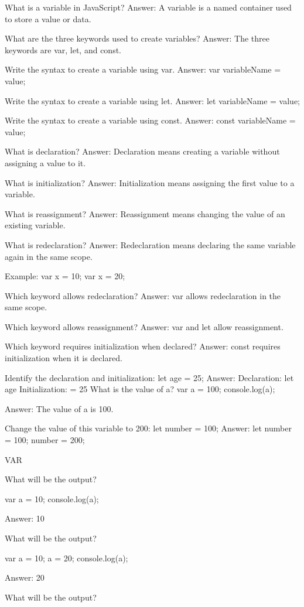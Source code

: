 What is a variable in JavaScript?
Answer: A variable is a named container used to store a value or data.

What are the three keywords used to create variables?
Answer: The three keywords are var, let, and const.

Write the syntax to create a variable using var.
Answer: var variableName = value;

Write the syntax to create a variable using let.
Answer: let variableName = value;

Write the syntax to create a variable using const.
Answer: const variableName = value;

What is declaration?
Answer: Declaration means creating a variable without assigning a value to it.

What is initialization?
Answer: Initialization means assigning the first value to a variable.


What is reassignment?
Answer: Reassignment means changing the value of an existing variable.


What is redeclaration?
Answer: Redeclaration means declaring the same variable again in the same scope.

Example: var x = 10; var x = 20;

Which keyword allows redeclaration?
Answer: var allows redeclaration in the same scope.

Which keyword allows reassignment?
Answer: var and let allow reassignment.

Which keyword requires initialization when declared?
Answer: const requires initialization when it is declared.

Identify the declaration and initialization: let age = 25;
Answer: Declaration: let age
Initialization: = 25
What is the value of a?
var a = 100;
console.log(a);

Answer: The value of a is 100.

Change the value of this variable to 200:
let number = 100;
Answer:
let number = 100;
number = 200;

VAR

What will be the output?

var a = 10;
console.log(a);

Answer: 10

What will be the output?

var a = 10;
a = 20;
console.log(a);

Answer: 20

What will be the output?

